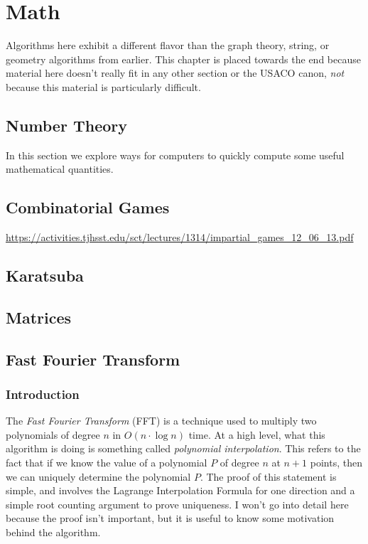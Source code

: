 \chapter{Math}

Algorithms here exhibit a different flavor than the graph theory, string, or geometry algorithms from earlier. This chapter is placed towards the end because material here doesn't really fit in any other section or the USACO canon, \textit{not} because this material is particularly difficult.

\section{Number Theory}

In this section we explore ways for computers to quickly compute some useful mathematical quantities.

\section{Combinatorial Games}

\url{https://activities.tjhsst.edu/sct/lectures/1314/impartial_games_12_06_13.pdf}

\section{Karatsuba}

\section{Matrices}

\section{Fast Fourier Transform}

\subsection{Introduction}

The \emph{Fast Fourier Transform} (FFT) is a technique used to multiply two polynomials of degree $n$ in $O(n \cdot \log n)$ time. At a high level, what this algorithm is doing is something called \emph{polynomial interpolation}. This refers to the fact that if we know the value of a polynomial $P$ of degree $n$ at $n+1$ points, then we can uniquely determine the polynomial $P.$ The proof of this statement is simple, and involves the Lagrange Interpolation Formula for one direction and a simple root counting argument to prove uniqueness. I won't go into detail here because the proof isn't important, but it is useful to know some motivation behind the algorithm.

